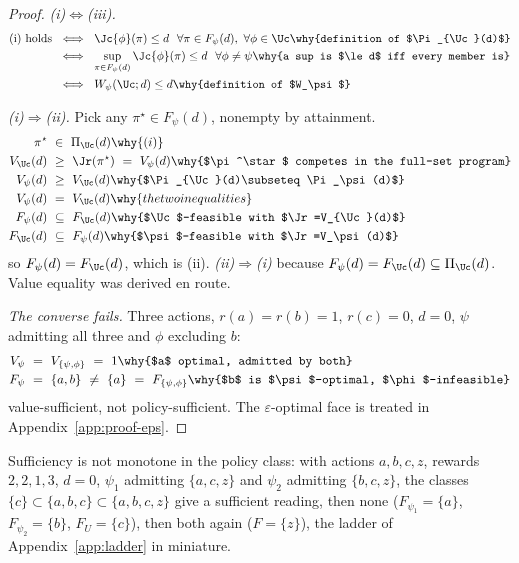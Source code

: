 \begin{proof}
\emph{(i)$\Leftrightarrow$(iii).}
\begin{align*}
\text{(i) holds}\ &\iff\ \Jc{\phi}(\pi)\le d\ \ \forall\pi\in F_\psi(d),\ \forall\phi\in\Uc
   \why{definition of $\Pi_{\Uc}(d)$}\\
   &\iff\ \sup_{\pi\in F_\psi(d)}\Jc{\phi}(\pi)\le d\ \ \forall\phi\ne\psi
   \why{a sup is $\le d$ iff every member is}\\
   &\iff\ W_\psi(\Uc;d)\le d
   \why{definition of $W_\psi$}
\end{align*}

\emph{(i)$\Rightarrow$(ii).} Pick any $\pi^\star\in F_\psi(d)$, nonempty by
attainment.
\begin{align*}
\pi^\star\ &\in\ \Pi_{\Uc}(d) \why{(i)}\\
V_{\Uc}(d)\ &\ge\ \Jr(\pi^\star)\ =\ V_\psi(d)
   \why{$\pi^\star$ competes in the full-set program}\\
V_\psi(d)\ &\ge\ V_{\Uc}(d) \why{$\Pi_{\Uc}(d)\subseteq\Pi_\psi(d)$}\\
V_\psi(d)\ &=\ V_{\Uc}(d) \why{the two inequalities}\\
F_\psi(d)\ &\subseteq\ F_{\Uc}(d)
   \why{$\Uc$-feasible with $\Jr=V_{\Uc}(d)$}\\
F_{\Uc}(d)\ &\subseteq\ F_\psi(d)
   \why{$\psi$-feasible with $\Jr=V_\psi(d)$}
\end{align*}
so $F_\psi(d)=F_{\Uc}(d)$, which is (ii). \emph{(ii)$\Rightarrow$(i)} because
$F_\psi(d)=F_{\Uc}(d)\subseteq\Pi_{\Uc}(d)$. Value equality was derived en route.

\emph{The converse fails.} Three actions, $r(a)=r(b)=1$, $r(c)=0$, $d=0$,
$\psi$ admitting all three and $\phi$ excluding $b$:
\begin{align*}
V_\psi\ &=\ V_{\{\psi,\phi\}}\ =\ 1 \why{$a$ optimal, admitted by both}\\
F_\psi\ &=\ \{a,b\}\ \ne\ \{a\}\ =\ F_{\{\psi,\phi\}}
   \why{$b$ is $\psi$-optimal, $\phi$-infeasible}
\end{align*}
value-sufficient, not policy-sufficient. The $\varepsilon$-optimal face is
treated in Appendix~\ref{app:proof-eps}.
\end{proof}

\noindent Sufficiency is not monotone in the policy class: with actions $a,b,c,z$,
rewards $2,2,1,3$, $d=0$, $\psi_1$ admitting $\{a,c,z\}$ and $\psi_2$ admitting
$\{b,c,z\}$, the classes $\{c\}\subset\{a,b,c\}\subset\{a,b,c,z\}$ give a sufficient
reading, then none ($F_{\psi_1}=\{a\}$, $F_{\psi_2}=\{b\}$, $F_U=\{c\}$), then both again
($F=\{z\}$), the ladder of Appendix~\ref{app:ladder} in miniature.

